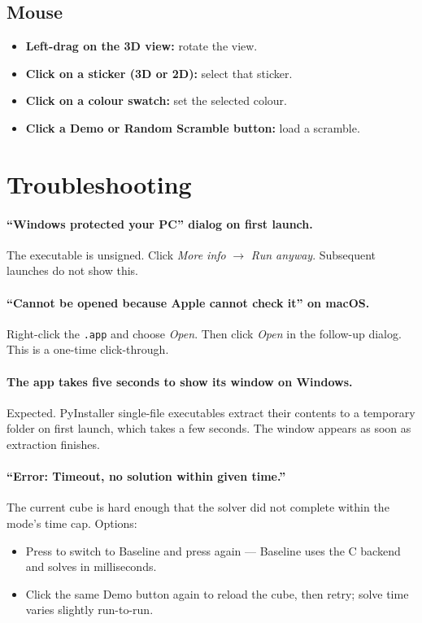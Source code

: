 \documentclass[11pt,a4paper]{article}
\newcommand{\key}[1]{\fbox{\texttt{\strut#1}}}
\begin{document}
\subsection{Mouse}
\begin{itemize}[leftmargin=2em]
  \item \textbf{Left-drag on the 3D view:} rotate the view.
  \item \textbf{Click on a sticker (3D or 2D):} select that sticker.
  \item \textbf{Click on a colour swatch:} set the selected colour.
  \item \textbf{Click a Demo or Random Scramble button:} load a scramble.
\end{itemize}

\section{Troubleshooting}

\paragraph{``Windows protected your PC'' dialog on first launch.}
The executable is unsigned. Click \textit{More info} $\to$ \textit{Run
anyway}. Subsequent launches do not show this.

\paragraph{``Cannot be opened because Apple cannot check it'' on macOS.}
Right-click the \texttt{.app} and choose \textit{Open}. Then click
\textit{Open} in the follow-up dialog. This is a one-time click-through.

\paragraph{The app takes five seconds to show its window on Windows.}
Expected. PyInstaller single-file executables extract their contents to
a temporary folder on first launch, which takes a few seconds. The
window appears as soon as extraction finishes.

\paragraph{``Error: Timeout, no solution within given time.''}
The current cube is hard enough that the solver did not complete within
the mode's time cap. Options:
\begin{itemize}[leftmargin=2em]
  \item Press \key{M} to switch to Baseline and press \key{Enter} again
        --- Baseline uses the C backend and solves in milliseconds.
  \item Click the same Demo button again to reload the cube, then
        retry; solve time varies slightly run-to-run.
\end{itemize}
\end{document}
